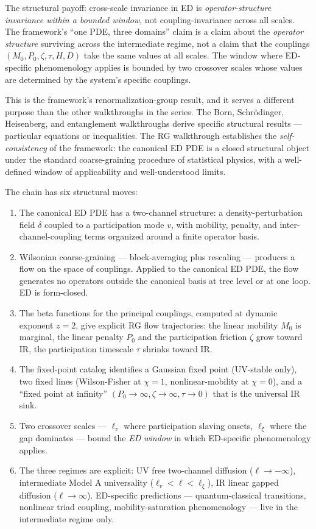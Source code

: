 \documentclass[11pt,a4paper]{article}
\begin{document}
The structural payoff: cross-scale invariance in ED is \emph{operator-structure invariance within a bounded window}, not coupling-invariance across all scales. The framework's ``one PDE, three domains'' claim is a claim about the \emph{operator structure} surviving across the intermediate regime, not a claim that the couplings $(M_0, P_0, \zeta, \tau, H, D)$ take the same values at all scales. The window where ED-specific phenomenology applies is bounded by two crossover scales whose values are determined by the system's specific couplings.

This is the framework's renormalization-group result, and it serves a different purpose than the other walkthroughs in the series. The Born, Schr\"odinger, Heisenberg, and entanglement walkthroughs derive specific structural results --- particular equations or inequalities. The RG walkthrough establishes the \emph{self-consistency} of the framework: the canonical ED PDE is a closed structural object under the standard coarse-graining procedure of statistical physics, with a well-defined window of applicability and well-understood limits.

The chain has six structural moves:

\begin{enumerate}[noitemsep]
\item The canonical ED PDE has a two-channel structure: a density-perturbation field $\delta$ coupled to a participation mode $v$, with mobility, penalty, and inter-channel-coupling terms organized around a finite operator basis.
\item Wilsonian coarse-graining --- block-averaging plus rescaling --- produces a flow on the space of couplings. Applied to the canonical ED PDE, the flow generates no operators outside the canonical basis at tree level or at one loop. ED is form-closed.
\item The beta functions for the principal couplings, computed at dynamic exponent $z = 2$, give explicit RG flow trajectories: the linear mobility $M_0$ is marginal, the linear penalty $P_0$ and the participation friction $\zeta$ grow toward IR, the participation timescale $\tau$ shrinks toward IR.
\item The fixed-point catalog identifies a Gaussian fixed point (UV-stable only), two fixed lines (Wilson-Fisher at $\chi = 1$, nonlinear-mobility at $\chi = 0$), and a ``fixed point at infinity'' $(P_0 \to \infty, \zeta \to \infty, \tau \to 0)$ that is the universal IR sink.
\item Two crossover scales --- $\ell_v$ where participation slaving onsets, $\ell_\xi$ where the gap dominates --- bound the \emph{ED window} in which ED-specific phenomenology applies.
\item The three regimes are explicit: UV free two-channel diffusion ($\ell \to -\infty$), intermediate Model A universality ($\ell_v < \ell < \ell_\xi$), IR linear gapped diffusion ($\ell \to \infty$). ED-specific predictions --- quantum-classical transitions, nonlinear triad coupling, mobility-saturation phenomenology --- live in the intermediate regime only.
\end{enumerate}
\end{document}
